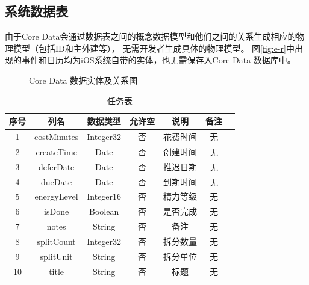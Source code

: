 \subsection{系统数据表}
由于Core Data会通过数据表之间的概念数据模型和他们之间的关系生成相应的物理模型（包括ID和主外建等），
无需开发者生成具体的物理模型。
图\ref{fig:e-r}中出现的事件和日历均为iOS系统自带的实体，也无需保存入Core Data 数据库中。

\begin{figure}[H]
	\centering
	\caption{Core Data 数据实体及关系图}
\end{figure}

\begin{table}[H]
  \centering
  \caption{任务表}
  \begin{tabular}{ccccccc} \toprule
	序号 & 列名 & 数据类型 & 允许空 & 说明 & 备注 \\
	\midrule
	1 & costMinutes & Integer32 & 否 & 花费时间 & 无 \\
	2 & createTime & Date & 否 & 创建时间 & 无 \\
	3 & deferDate & Date & 否 & 推迟日期 & 无 \\
	4 & dueDate & Date & 否 & 到期时间 & 无 \\
	5 & energyLevel & Integer16 & 否 & 精力等级 & 无 \\
	6 & isDone & Boolean & 否 & 是否完成 & 无 \\
	7 & notes & String & 否 & 备注 & 无 \\
	8 & splitCount & Integer32 & 否 & 拆分数量 & 无 \\
	9 & splitUnit & String & 否 & 拆分单位 & 无 \\
	10 & title & String & 否 & 标题 & 无 \\
	\bottomrule
  \end{tabular}
\end{table}

